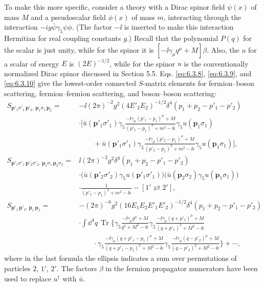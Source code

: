 To make this more specific, consider a theory with a Dirac spinor field
$\psi(x)$ of mass $M$ and a pseudoscalar field $\phi(x)$ of mass $m$,
interacting through the interaction $-ig\bar\psi\gamma_5\psi\phi$. (The factor
$-\ii$ is inserted to make this interaction Hermitian for real coupling
constants $g$.) Recall that the polynomial $P(q)$ for the scalar is just unity,
while for the spinor it is $[-\ii\gamma_\mu q^\mu+M]\beta$. Also, the $u$ for a
scalar of energy $E$ is $(2E)^{-1/2}$, while for the spinor $u$ is the
conventionally normalized Dirac spinor discussed in Section 5.5. Eqs. \eqref{eq:6.3.8},
\eqref{eq:6.3.9}, and \eqref{eq:6.3.10} give the lowest-order connected $S$-matrix elements for
fermion--boson scattering, fermion--fermion scattering, and boson--boson
scattering:
\begin{align*}
S_{\mathbf p'_1\sigma'_1\,\mathbf p'_2,\,\mathbf p_1\sigma_1\,\mathbf p_2}
={}&-\ii(2\pi)^{-2}g^2(4E'_2E_2)^{-1/2}
\delta^4(p_1+p_2-p'_1-p'_2)\\
&\cdot\Biggl[
\bar u(\mathbf p'_1\sigma'_1)\gamma_5
\frac{-\ii\gamma_\mu(p'_1-p_1)^\mu+M}{(p'_1-p_1)^2+m^2-\ii\epsilon}
\gamma_5u(\mathbf p_1\sigma_1)\\
&\qquad{}+\bar u(\mathbf p'_1\sigma'_1)\gamma_5
\frac{-\ii\gamma_\mu(p'_2-p_1)^\mu+M}{(p'_2-p_1)^2+m^2-\ii\epsilon}
\gamma_5u(\mathbf p_1\sigma_1)\Biggr],
\\[4pt]
S_{\mathbf p'_1\sigma'_1\,\mathbf p'_2\sigma'_2,\,
\mathbf p_1\sigma_1\,\mathbf p_2\sigma_2}
={}&\ii(2\pi)^{-2}g^2\delta^4(p_1+p_2-p'_1-p'_2)\\
&\cdot\bigl(\bar u(\mathbf p'_2\sigma'_2)\gamma_5u(\mathbf p'_1\sigma'_1)\bigr)
\bigl(\bar u(\mathbf p_2\sigma_2)\gamma_5u(\mathbf p_1\sigma_1)\bigr)\\
&\cdot\frac{1}{(p'_1-p_1)^2+m^2-\ii\epsilon}-[1'\rightleftarrows2'],
\\[4pt]
S_{\mathbf p'_1\,\mathbf p'_2,\,\mathbf p_1\,\mathbf p_2}
={}&-(2\pi)^{-6}g^2(16E_1E_2E'_1E'_2)^{-1/2}
\delta^4(p_1+p_2-p'_1-p'_2)\\
&\cdot\int \dd^4q\,\operatorname{Tr}\Biggl\{
\gamma_5\frac{-\ii\gamma_\mu q^\mu+M}{q^2+M^2-\ii\epsilon}
\gamma_5\frac{-\ii\gamma_\mu(q+p'_1)^\mu+M}{(q+p'_1)^2+M^2-\ii\epsilon}\\
&\qquad\cdot\gamma_5
\frac{-\ii\gamma_\mu(q+p'_1-p_1)^\mu+M}{(q+p'_1-p_1)^2+M^2-\ii\epsilon}
\gamma_5\frac{-\ii\gamma_\mu(q-p'_2)^\mu+M}{(q-p'_2)^2+M^2-\ii\epsilon}
\Biggr\}+\cdots,
\end{align*}
where in the last formula the ellipsis indicates a sum over permutations of
particles $2$, $1'$, $2'$. The factors $\beta$ in the fermion propagator
numerators have been used to replace $u^\dagger$ with $\bar u$.

